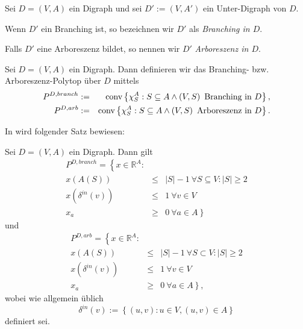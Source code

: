 \documentclass[10p,a4paper,BCOR = 12mm, DIV=15]{scrbook}
\begin{document}
{\begin{Def}
Sei $D=\left(V, A\right)$ ein Digraph und sei $D':=\left(V, A'\right)$ ein Unter-Digraph von $D$.

Wenn $D'$ ein Branching ist, so bezeichnen wir $D'$ als \emph{Branching in $D$}.

Falls $D'$ eine Arboreszenz bildet, so nennen wir $D'$ \emph{Arboreszenz in $D$}.
\end{Def}

\begin{Def}
Sei $D=\left(V, A\right)$ ein Digraph. Dann definieren wir das Branching- bzw. Arbores\-zenz-Polytop über $D$ mittels
\begin{eqnarray*}
P^{D, branch} & := & \operatorname{conv} \left\{\chi^A_{S}: S \subseteq A \wedge \left(V, S\right) \textnormal{ Branching in }D\right\}, \\
P^{D, arb} & := & \operatorname{conv} \left\{\chi^A_{S}: S \subseteq A \wedge \left(V, S\right) \textnormal{ Arboreszenz in }D\right\}.
\end{eqnarray*}
\end{Def}

In \cite{schrijver2003combinatorial} wird folgender Satz bewiesen:
\begin{Sa}
Sei $D=\left(V, A\right)$ ein Digraph. Dann gilt
\begin{eqnarray*}
P^{D, branch} = \left\{x \in \mathbb{R}^A: \right. & & \\
x\left(A\left(S\right)\right) & \leq & \left|S\right| - 1 \ \forall S \subseteq V: \left|S\right| \geq 2 \\
x\left(\delta^{in}\left(v\right)\right) & \leq & 1 \ \forall v \in V \\
x_a & \geq & \left. 0 \ \forall a \in A\right\}
\end{eqnarray*}
und
\begin{eqnarray*}
P^{D, arb} = \left\{x \in \mathbb{R}^A: \right. & & \\
x\left(A\left(S\right)\right) & \leq & \left|S\right| - 1 \ \forall S \subset V: \left|S\right| \geq 2 \\
x\left(\delta^{in}\left(v\right)\right) & \leq & 1 \ \forall v \in V \\
x_a & \geq & \left. 0 \ \forall a \in A\right\},
\end{eqnarray*}
wobei wie allgemein üblich
\begin{displaymath}
\delta^{in}\left(v\right) := \left\{\left(u, v\right): u \in V, \left(u, v\right) \in A\right\}
\end{displaymath}
definiert sei.
\end{Sa}

}
\end{document}
